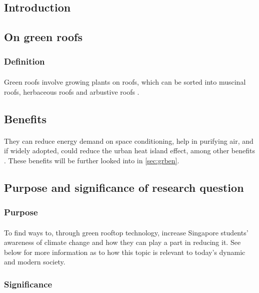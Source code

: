 \documentclass[a4paper]{article}
\begin{document}
\begin{multicols}{2}

  \section{Introduction}
  \subsection{On green roofs}
  \subsubsection{Definition}
  \paragraph{} Green roofs involve growing plants on roofs, which can
  be sorted into muscinal roofs, herbaceous roofs and arbustive roofs
  \parencite{ecoeng}.


  \subsection{Benefits}
  \paragraph{} They can reduce energy demand on space conditioning,
  help in purifying air, and if widely adopted, could reduce the urban
  heat island effect, among other benefits \parencite{energeff}. These
  benefits will be further looked into in \cref{sec:grben}.


  \subsection{Purpose and significance of research question}
  \subsubsection{Purpose}
  \paragraph{} To find ways to, through green rooftop technology, increase
  Singapore students' awareness of climate change and how they can play
  a part in reducing it. See below for more information as to how this
  topic is relevant to today's dynamic and modern society.

  \subsubsection{Significance}

\end{multicols}
\end{document}
